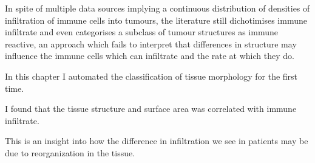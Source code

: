 In spite of multiple data sources implying a continuous distribution of densities of infiltration of immune cells into tumours, the literature still dichotimises immune infiltrate and even categorises a subclass of tumour structures as immune reactive, an approach which fails to interpret that differences in structure may influence the immune cells which can infiltrate and the rate at which they do.

In this chapter I automated the classification of tissue morphology for the first time. 


I found that the tissue structure and surface area was correlated with immune infiltrate. 

This is an insight into how the difference in infiltration we see in patients may be due to reorganization in the tissue. 
